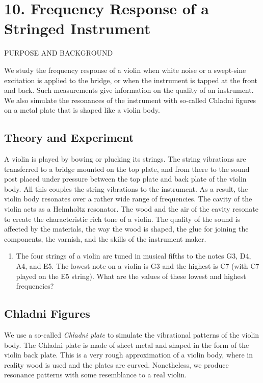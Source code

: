 \documentclass[11pt]{NSF}
\def\ben{\begin{enumerate}}
\def\een{\end{enumerate}}
\begin{document}
\section{10. Frequency Response of a Stringed Instrument}

PURPOSE AND BACKGROUND

We study the frequency response of a violin when white noise or a
swept-sine excitation is applied to the bridge, or when the 
instrument is tapped at the front and back. 
Such measurements give information on the quality of an
instrument. We also simulate the resonances of the instrument with
so-called Chladni figures on a metal plate that is shaped like a
violin body.


\subsection{Theory and Experiment}

A violin is played by bowing or plucking its strings. The string
vibrations are transferred to a bridge mounted on the top plate, and
from there to the sound post placed under pressure between the top
plate and back plate of the violin body. All this couples the string
vibrations to the instrument. As a result, the violin body resonates
over a rather wide range of frequencies. The cavity of the violin acts as a
Helmholtz resonator. The wood and the air of the cavity resonate to
create the characteristic rich tone of a violin. The quality of the
sound is affected by the materials, the way the wood is shaped, the
glue for joining the components, the varnish, and the skills of the
instrument maker.

\ben
\item
The four strings of a violin are tuned in musical fifths to the
notes G3, D4, A4, and E5. 
The lowest note on a violin is G3 and the highest is C7 
(with C7 played on the E5 string). 
What are the values of these lowest and highest frequencies?

\een

\subsection{Chladni Figures}

We use a so-called {\em Chladni plate} to simulate the vibrational patterns
of the violin body. The Chladni plate is made of sheet metal and
shaped in the form of the violin back plate. This is a very rough
approximation of a violin body, where in reality wood is used and the
plates are curved. Nonetheless, we produce resonance patterns with
some resemblance to a real violin.
\end{document}
